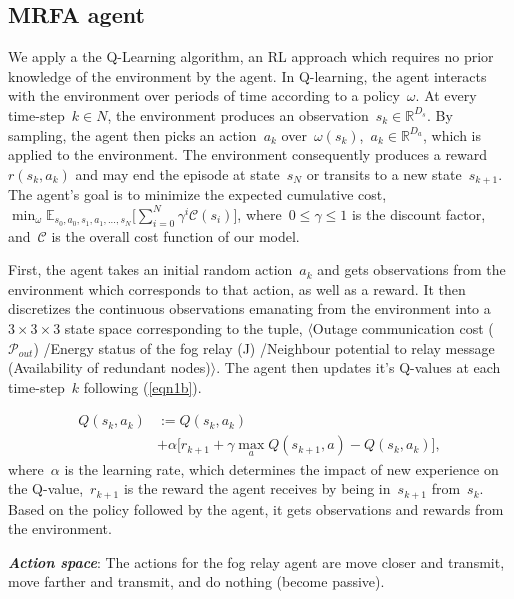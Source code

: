 \documentclass[journal]{IEEEtran}
\begin{document}
\subsection{MRFA agent}
We apply a the Q-Learning algorithm, an RL approach which requires no prior knowledge of the environment by the agent. In Q-learning, the agent interacts with the environment over periods of time according to a policy~$\omega$. At every time-step~$k \in N$, the environment produces an observation~$s_{k} \in \mathbb{R}^{D_s}$. By sampling, the agent then picks an action~$a_{k}$ over~$\omega(s_{k})$,~$a_{k} \in \mathbb{R}^{D_a}$, which is applied to the environment. The environment consequently produces a reward~$r(s_{k}, a_{k})$ and may end the episode at state~$s_{N}$ or transits to a new state~$s_{k + 1}$. The agent's goal is to minimize the expected cumulative cost,~$\min_{\omega} \mathbb{E}_{s_0, a_0, s_1, a_1, ..., s_N} \Big[ \sum_{i=0}^{N} \gamma^i \mathcal{C}(s_i) \Big]$, where~$0 \leq \gamma \leq 1$ is the discount factor, and~$\mathcal{C}$ is the overall cost function of our model.

First, the agent takes an initial random action~$a_{k}$ and gets observations from the environment which corresponds to that action, as well as a reward. It then discretizes the continuous observations emanating from the environment into a~$3 \times 3 \times 3$ state space corresponding to the tuple, $\langle$Outage communication cost ($\mathcal{P}_{out}$) /Energy status of the fog relay (J) /Neighbour potential to relay message (Availability of redundant nodes)$\rangle$. The agent then updates it's Q-values at each time-step~$k$ following (\ref{eqn1b}).

\begin{equation}\label{eqn1b}
\begin{split}
Q(s_k, a_k) &:= Q(s_k, a_k)\\
& + \alpha \Big[ r_{k + 1} + \gamma \max_{a}  Q(s_{k + 1}, a) -  Q(s_k, a_k) \Big],
   \end{split}
\end{equation}
where~$\alpha$ is the learning rate, which determines the impact of new experience on the Q-value,~$r_{k + 1}$ is the reward the agent receives by being in~$s_{k + 1}$ from~$s_{k}$. Based on the policy followed by the agent, it gets observations and rewards from the environment.

\emph{\textbf{Action space}}: The actions for the fog relay agent are move closer and transmit, move farther and transmit, and do nothing (become passive).
 
\end{document}
